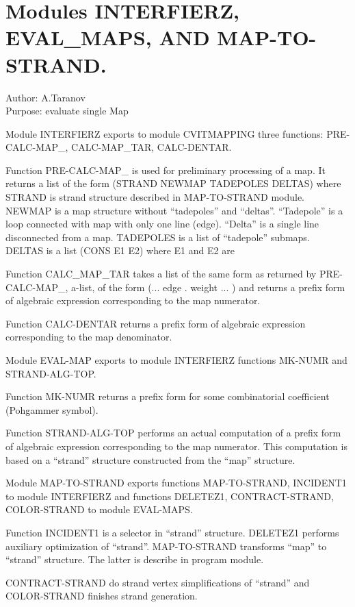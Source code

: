 \section*{Modules INTERFIERZ, EVAL\_MAPS, AND MAP-TO-STRAND.}

\begin{center}
Author: A.Taranov \\
Purpose: evaluate single Map
\end{center}

Module INTERFIERZ exports to module CVITMAPPING three functions:
PRE-CALC-MAP\_, CALC-MAP\_TAR, CALC-DENTAR.

Function PRE-CALC-MAP\_ is used for preliminary processing of a map. It
returns a list of the form (STRAND NEWMAP TADEPOLES DELTAS) where
STRAND is strand structure described in MAP-TO-STRAND module.  NEWMAP
is a map structure without ``tadepoles'' and ``deltas''.  ``Tadepole'' is a
loop connected with map with only one line (edge). ``Delta'' is a single
line disconnected from a map.  TADEPOLES is a list of ``tadepole''
submaps.  DELTAS is a list (CONS E1 E2) where E1 and E2 are

Function CALC\_MAP\_TAR takes a list of the same form as returned by
PRE-CALC-MAP\_, a-list, of the form (...  edge . weight ...  )  and
returns a prefix form of algebraic expression corresponding to the map
numerator.

Function CALC-DENTAR returns a prefix form of algebraic expression
corresponding to the map denominator.

Module EVAL-MAP exports to module INTERFIERZ functions MK-NUMR and
STRAND-ALG-TOP.

Function MK-NUMR returns a prefix form for some combinatorial
coefficient (Pohgammer symbol).

Function STRAND-ALG-TOP performs an actual computation of a prefix
form of algebraic expression corresponding to the map numerator. This
computation is based on a ``strand'' structure constructed from the
``map'' structure.

Module MAP-TO-STRAND exports functions MAP-TO-STRAND, INCIDENT1 to
module INTERFIERZ and functions DELETEZ1, CONTRACT-STRAND,
COLOR-STRAND to module EVAL-MAPS.

Function INCIDENT1 is a selector in ``strand'' structure.  DELETEZ1
performs auxiliary optimization of ``strand''.  MAP-TO-STRAND transforms
``map'' to ``strand'' structure.  The latter is describe in program
module.

CONTRACT-STRAND do strand vertex simplifications of ``strand'' and
COLOR-STRAND finishes strand generation.

